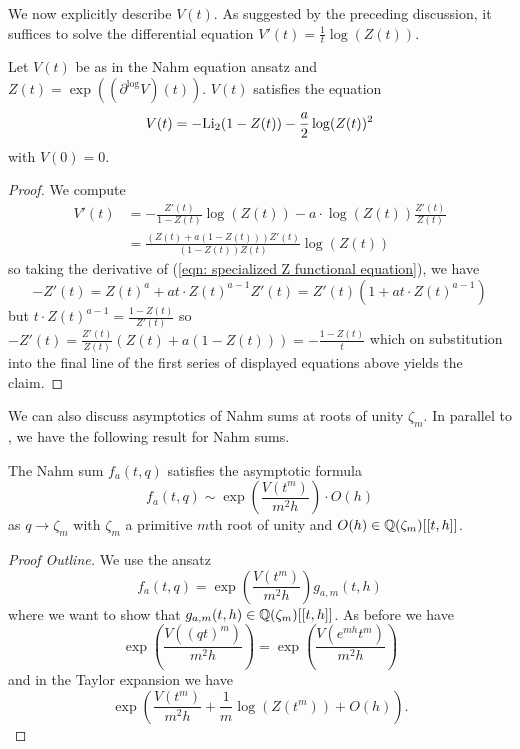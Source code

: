 We now explicitly describe $V(t)$. As suggested by the preceding discussion, it suffices to solve the differential equation $V'(t)=\frac{1}{t}\log(Z(t))$. 
\begin{proposition}\label{prop: V t dilogarithm equation}
    Let $V(t)$ be as in the Nahm equation ansatz and $Z(t)=\exp((\partial^{\log}V)(t))$. $V(t)$ satisfies the equation 
    \begin{equation}\label{eqn: V t dilogarithm equation}
        V(t) = -\mathrm{Li}_{2}(1-Z(t))-\frac{a}{2}\log(Z(t))^{2}
    \end{equation}
    with $V(0)=0$. 
\end{proposition}
\begin{proof}
    We compute 
    \begin{align*}
        V'(t) &= -\frac{Z'(t)}{1-Z(t)}\log(Z(t)) - a\cdot\log(Z(t))\frac{Z'(t)}{Z(t)} \\
        &= \frac{(Z(t)+a(1-Z(t)))Z'(t)}{(1-Z(t))Z(t)}\log(Z(t))
    \end{align*}
    so taking the derivative of (\ref{eqn: specialized Z functional equation}), we have 
    $$-Z'(t)=Z(t)^{a}+at\cdot Z(t)^{a-1}Z'(t)=Z'(t)\left(1+at\cdot Z(t)^{a-1}\right)$$
    but $t\cdot Z(t)^{a-1}=\frac{1-Z(t)}{Z'(t)}$ so $-Z'(t)=\frac{Z'(t)}{Z(t)}(Z(t)+a(1-Z(t)))=-\frac{1-Z(t)}{t}$ which on substitution into the final line of the first series of displayed equations above yields the claim. 
\end{proof}
We can also discuss asymptotics of Nahm sums at roots of unity $\zeta_{m}$. In parallel to , we have the following result for Nahm sums. 
\begin{theorem}\label{thm: Nahm sum asymptotics at roots of unity}
    The Nahm sum $f_{a}(t,q)$ satisfies the asymptotic formula 
    \begin{equation}\label{eqn: Nahm sum asymptotics at roots of unity}
        f_{a}(t,q)\sim\exp\left(\frac{V(t^{m})}{m^{2}h}\right)\cdot O(h)
    \end{equation}
    as $q\to\zeta_{m}$ with $\zeta_{m}$ a primitive $m$th root of unity and $O(h)\in\mathbb{Q}(\zeta_{m})[[t,h]]$. 
\end{theorem}
\begin{proof}[Proof Outline]
    We use the ansatz 
\begin{equation}\label{eqn: Nahm sum at roots of unity ansatz}
    f_{a}(t,q) = \exp\left(\frac{V(t^{m})}{m^{2}h}\right)g_{a,m}(t,h)
\end{equation}
where we want to show that $g_{a,m}(t,h)\in\mathbb{Q}(\zeta_{m})[[t,h]]$. As before we have 
$$\exp\left(\frac{V((qt)^{m})}{m^{2}h}\right)=\exp\left(\frac{V(e^{mh}t^{m})}{m^{2}h}\right)$$
and in the Taylor expansion we have 
$$\exp\left(\frac{V(t^{m})}{m^{2}h}+\frac{1}{m}\log(Z(t^{m}))+O(h)\right).$$
\end{proof}
